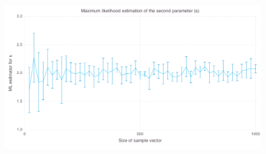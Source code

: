 \documentclass[final]{aomart}
\newtheorem[{}\it]{thm}{Theorem}[section]
\theoremstyle{definition}
\newtheorem*[{}\it]{notation}{Notation}
\numberwithin{equation}{section}
\begin{document}
\begin{figure}[H]
	\centering
	\includegraphics[width=\textwidth]{img/s_ml.png}
\end{figure}
\end{document}
